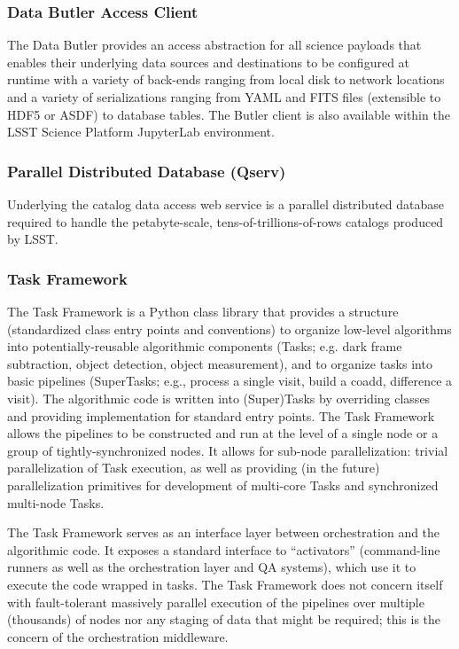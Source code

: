 \documentclass[DM,toc]{lsstdoc}
\begin{document}
\subsubsection{Data Butler Access
Client}\label{data-butler-access-client}

The Data Butler provides an access abstraction for all science payloads
that enables their underlying data sources and destinations to be
configured at runtime with a variety of back-ends ranging from local
disk to network locations and a variety of serializations ranging from
YAML and FITS files (extensible to HDF5 or ASDF) to database tables. The
Butler client is also available within the LSST Science Platform
JupyterLab environment.

\subsubsection{Parallel Distributed Database
(Qserv)}\label{parallel-distributed-database-qserv}

Underlying the catalog data access web service is a parallel distributed
database required to handle the petabyte-scale,
tens-of-trillions-of-rows catalogs produced by LSST.

\subsubsection{Task Framework}\label{task-framework}

The Task Framework is a Python class library that provides a structure
(standardized class entry points and conventions) to organize low-level
algorithms into potentially-reusable algorithmic components (Tasks; e.g.
dark frame subtraction, object detection, object measurement), and to
organize tasks into basic pipelines (SuperTasks; e.g., process a single
visit, build a coadd, difference a visit). The algorithmic code is
written into (Super)Tasks by overriding classes and providing
implementation for standard entry points. The Task Framework allows the
pipelines to be constructed and run at the level of a single node or a
group of tightly-synchronized nodes. It allows for sub-node
parallelization: trivial parallelization of Task execution, as well as
providing (in the future) parallelization primitives for development of
multi-core Tasks and synchronized multi-node Tasks.

The Task Framework serves as an interface layer between orchestration
and the algorithmic code. It exposes a standard interface to
``activators'' (command-line runners as well as the orchestration layer
and QA systems), which use it to execute the code wrapped in tasks. The
Task Framework does not concern itself with fault-tolerant massively
parallel execution of the pipelines over multiple (thousands) of nodes
nor any staging of data that might be required; this is the concern of
the orchestration middleware.
\end{document}

